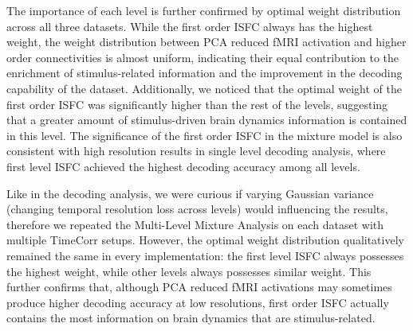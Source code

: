 \documentclass[11pt]{article}
\begin{document}
The importance of each level is further confirmed by optimal weight distribution across all three datasets. While the first order ISFC always has the highest weight, the weight distribution between PCA reduced fMRI activation and higher order connectivities is almost uniform, indicating their equal contribution to the enrichment of stimulus-related information and the improvement in the decoding capability of the dataset. Additionally, we noticed that the optimal weight of the first order ISFC was significantly higher than the rest of the levels, suggesting that a greater amount of stimulus-driven brain dynamics information is contained in this level. The significance of the first order ISFC in the mixture model is also consistent with high resolution results in single level decoding analysis, where first level ISFC achieved the highest decoding accuracy among all levels.

Like in the decoding analysis, we were curious if varying Gaussian variance (changing temporal resolution loss across levels) would influencing the results, therefore we repeated the Multi-Level Mixture Analysis on each dataset with multiple TimeCorr setups. However, the optimal weight distribution qualitatively remained the same in every implementation: the first level ISFC always possesses the highest weight, while other levels always possesses similar weight. This further confirms that, although PCA reduced fMRI activations may sometimes produce higher decoding accuracy at low resolutions, first order ISFC actually contains the most information on brain dynamics that are stimulus-related.


\clearpage
\newpage
\end{document}
